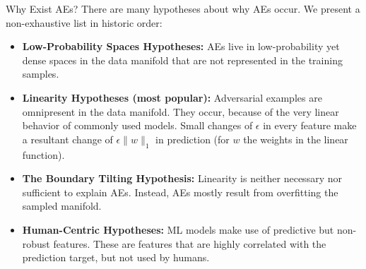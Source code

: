 \documentclass[11pt,compress,t,notes=noshow, xcolor=table]{beamer}
\begin{document}
\begin{vbframe}{Why Exist AEs?}
There are many hypotheses about why AEs occur. We present a non-exhaustive list in historic order:
\begin{itemize}
    \item \textbf{Low-Probability Spaces Hypotheses:} AEs live in low-probability yet dense spaces in the data manifold that are not represented in the training samples.
    \item \textbf{Linearity Hypotheses (most popular):} Adversarial examples are omnipresent in the data manifold. They occur, because of the very linear behavior of commonly used models. Small changes of $\epsilon$ in every feature make a resultant change of $\epsilon\|w\|_1$ in prediction (for $w$ the weights in the linear function).
    \item \textbf{The Boundary Tilting Hypothesis:} Linearity is neither necessary nor sufficient to explain AEs. Instead, AEs mostly result from overfitting the sampled manifold.
    \item \textbf{Human-Centric Hypotheses:} ML models make use of predictive but non-robust features. These are features that are highly correlated with the prediction target, but not used by humans.
\end{itemize}
\end{vbframe}
\end{document}
